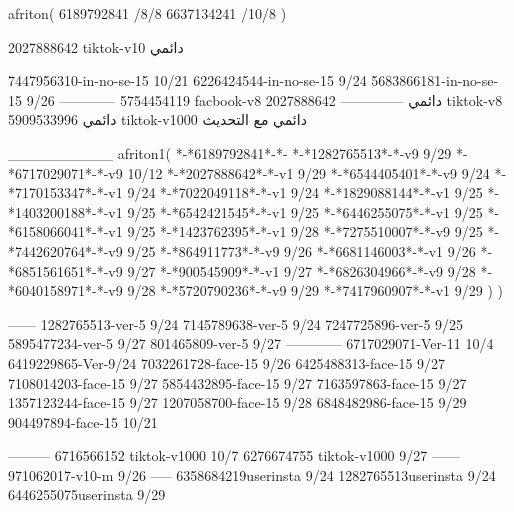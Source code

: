 afriton(
6189792841 /8/8
6637134241 /10/8
)

2027888642 tiktok-v10
دائمي


7447956310-in-no-se-15 10/21
6226424544-in-no-se-15 9/24
5683866181-in-no-se-15 9/26
------------
5754454119 facbook-v8
دائمي
--------------
2027888642 tiktok-v8
دائمي
5909533996 tiktok-v1000
دائمي مع التحديث

__________
afriton1(
*-*6189792841*-*-
*-*1282765513*-*-v9 9/29
*-*6717029071*-*-v9 10/12
*-*2027888642*-*-v1 9/29
*-*6544405401*-*-v9 9/24
*-*7170153347*-*-v1 9/24
*-*7022049118*-*-v1 9/24
*-*1829088144*-*-v1 9/25
*-*1403200188*-*-v1 9/25
*-*6542421545*-*-v1 9/25
*-*6446255075*-*-v1 9/25
*-*6158066041*-*-v1 9/25
*-*1423762395*-*-v1 9/28
*-*7275510007*-*-v9 9/25
*-*7442620764*-*-v9 9/25
*-*864911773*-*-v9 9/26
*-*6681146003*-*-v1 9/26
*-*6851561651*-*-v9 9/27
*-*900545909*-*-v1 9/27
*-*6826304966*-*-v9 9/28
*-*6040158971*-*-v9 9/28
*-*5720790236*-*-v9 9/29
*-*7417960907*-*-v1 9/29
)
)

------
1282765513-ver-5 9/24
7145789638-ver-5 9/24
7247725896-ver-5 9/25
5895477234-ver-5 9/27
801465809-ver-5 9/27
------------
6717029071-Ver-11
10/4
6419229865-Ver-9/24
7032261728-face-15 9/26
6425488313-face-15 9/27
7108014203-face-15 9/27
5854432895-face-15 9/27
7163597863-face-15 9/27
1357123244-face-15 9/27
1207058700-face-15 9/28
6848482986-face-15 9/29
904497894-face-15 10/21

---------
6716566152 tiktok-v1000
10/7
6276674755 tiktok-v1000
9/27
------
971062017-v10-m 9/26
-----
6358684219userinsta 9/24
1282765513userinsta 9/24
6446255075userinsta 9/29
